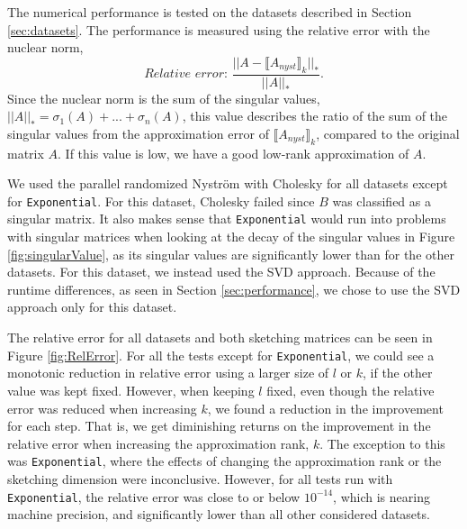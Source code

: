 \documentclass{article}
\theoremstyle{definition}
\begin{document}
The numerical performance is tested on the datasets described in Section
\ref{sec:datasets}. The performance is measured using the relative error with
the nuclear norm,
\begin{equation}
    \textit{Relative error: } \frac{||A-\llbracket A_{nyst}\rrbracket_k||_*}{||A||_*}.
\end{equation}
Since the nuclear norm is the sum of the singular values,
$||A||_*=\sigma_1(A)+...+\sigma_n(A)$, this value describes the ratio of the sum
of the singular values from the approximation error of $\llbracket
A_{nyst}\rrbracket_k$, compared to the original matrix $A$. If this value is
low, we have a good low-rank approximation of $A$. \newline

We used the parallel randomized Nyström with Cholesky for all datasets except
for \texttt{Exponential}. For this dataset, Cholesky failed since $B$ was
classified as a singular matrix. It also makes sense that \texttt{Exponential}
would run into problems with singular matrices when looking at the decay of the
singular values in Figure \ref{fig:singularValue}, as its singular values are
significantly lower than for the other datasets. For this dataset, we instead
used the SVD approach. Because of the runtime differences, as seen in Section
\ref{sec:performance}, we chose to use the SVD approach only for this
dataset.\newline

The relative error for all datasets and both sketching matrices can be seen in
Figure \ref{fig:RelError}. For all the tests except for \texttt{Exponential}, we
could see a monotonic reduction in relative error using a larger size of $l$ or
$k$, if the other value was kept fixed. However, when keeping $l$ fixed, even
though the relative error was reduced when increasing $k$, we found a reduction
in the improvement for each step. That is, we get diminishing returns on the
improvement in the relative error when increasing the approximation rank, $k$.
The exception to this was \texttt{Exponential}, where the effects of changing
the approximation rank or the sketching dimension were inconclusive. However,
for all tests run with \texttt{Exponential}, the relative error was close to or
below $10^{-14}$, which is nearing machine precision, and significantly lower
than all other considered datasets. \newline
\end{document}
